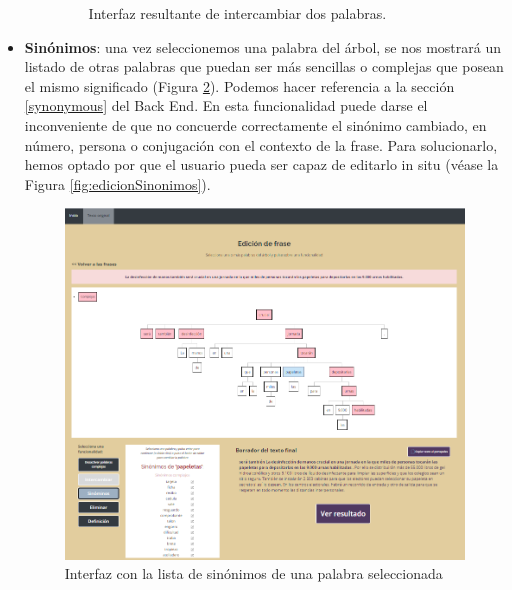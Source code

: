 \begin{itemize}
\begin{itemize}
\begin{figure}[h!]
	
	\caption{Interfaz resultante de intercambiar dos palabras.}
	\label{fig:resultadoIntercambio}
\end{figure}
\end{itemize}


\item \textbf{Sinónimos}: una vez seleccionemos una palabra del árbol, se nos mostrará un listado de otras palabras que puedan ser más sencillas o complejas que posean el mismo significado (Figura \ref{fig:listaSinonimos}). Podemos hacer referencia a la sección  \ref{synonymous} del Back End. En esta funcionalidad puede darse el inconveniente de que no concuerde correctamente el sinónimo cambiado, en número, persona o conjugación con el contexto de la frase. Para solucionarlo, hemos optado por que el usuario pueda ser capaz de editarlo in situ (véase la Figura \ref{fig:edicionSinonimos}).
	 \begin{figure}[h!]
	\centering
	
	
	\includegraphics[scale=0.56]{Imagenes/Figuras/SinonimosComplejos}
	
	
	\caption{Interfaz con la lista de sinónimos de una palabra seleccionada}
	\label{fig:listaSinonimos}
\end{figure}
	 \begin{figure}[h!]
	\centering
	

\end{figure}
\end{itemize}
